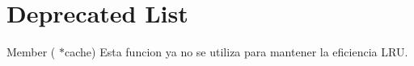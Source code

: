 \chapter{Deprecated List}
\hypertarget{deprecated}{}\label{deprecated}

\begin{DoxyRefList}
\item[Member \doxylink{lru_8h_ae0b475932ca6361681355887f8fe004b}{actualizar\+\_\+ultimo} (\doxylink{structLRUcache}{LRUcache} \texorpdfstring{$\ast$}{*}cache)]\label{deprecated__deprecated000001}%
%
Esta funcion ya no se utiliza para mantener la eficiencia LRU. 
\end{DoxyRefList}